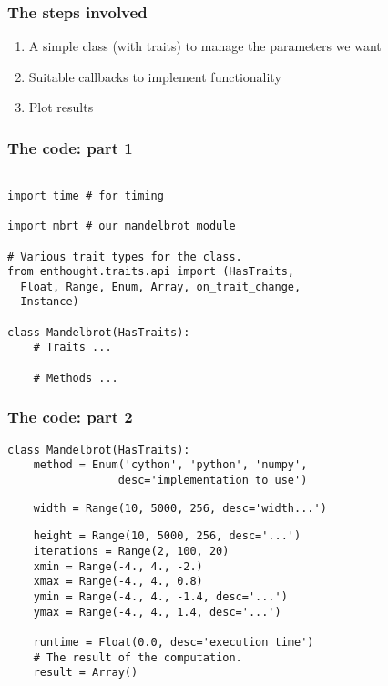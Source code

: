 \documentclass[14pt,compress]{beamer}
\newcounter{time}
\begin{document}
\begin{frame}
    \frametitle{The steps involved}
    \begin{enumerate}
        \item A simple class (with traits) to manage the parameters we want
        \item Suitable callbacks to implement functionality
        \item Plot results
    \end{enumerate}
\end{frame}

\begin{frame}
  \frametitle{The code: part 1}
\small
\begin{lstlisting}

import time # for timing

import mbrt # our mandelbrot module

# Various trait types for the class.
from enthought.traits.api import (HasTraits, 
  Float, Range, Enum, Array, on_trait_change,
  Instance)

class Mandelbrot(HasTraits):
    # Traits ...

    # Methods ...
  \end{lstlisting}
\end{frame}

\begin{frame}
  \frametitle{The code: part 2}
\small
\begin{lstlisting}
class Mandelbrot(HasTraits):
    method = Enum('cython', 'python', 'numpy', 
                 desc='implementation to use')
\end{lstlisting}
\pause
\vspace*{-1em}
\begin{lstlisting}
    width = Range(10, 5000, 256, desc='width...')
\end{lstlisting}
\pause
\vspace*{-1em}
\begin{lstlisting}
    height = Range(10, 5000, 256, desc='...')
    iterations = Range(2, 100, 20)
    xmin = Range(-4., 4., -2.)
    xmax = Range(-4., 4., 0.8)
    ymin = Range(-4., 4., -1.4, desc='...')
    ymax = Range(-4., 4., 1.4, desc='...')

    runtime = Float(0.0, desc='execution time')
    # The result of the computation.
    result = Array()
  \end{lstlisting}
\end{frame}
\end{document}
